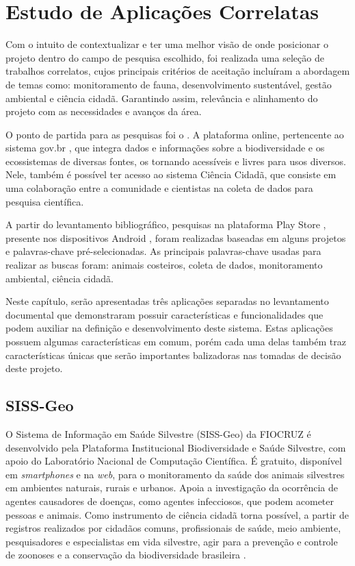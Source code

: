 \chapter{Estudo de Aplicações Correlatas}\label{trabalhos-correlatos}

Com o intuito de contextualizar e ter uma melhor visão de onde posicionar o projeto dentro do campo de pesquisa escolhido, foi realizada uma seleção de trabalhos correlatos, cujos principais critérios de aceitação incluíram a abordagem de temas como: monitoramento de fauna, desenvolvimento sustentável, gestão ambiental e ciência cidadã. Garantindo assim, relevância e alinhamento do projeto com as necessidades e avanços da área.

O ponto de partida para as pesquisas foi o . A plataforma online, pertencente ao sistema gov.br \cite{govbr2024}, que integra dados e informações sobre a biodiversidade e os ecossistemas de diversas fontes, os tornando acessíveis e livres para usos diversos. Nele, também é possível ter acesso ao sistema Ciência Cidadã, que consiste em uma colaboração entre a comunidade e cientistas na coleta de dados para pesquisa científica. 

A partir do levantamento bibliográfico, pesquisas na plataforma Play Store \cite{playstore2024}, presente nos dispositivos Android \cite{android2024}, foram realizadas baseadas em alguns projetos e palavras-chave pré-selecionadas. As principais palavras-chave usadas para realizar as buscas foram: animais costeiros, coleta de dados, monitoramento ambiental, ciência cidadã.

Neste capítulo, serão apresentadas três aplicações separadas no levantamento documental que  demonstraram possuir características e funcionalidades que podem auxiliar na definição e desenvolvimento deste sistema. Estas aplicações possuem algumas características em comum, porém cada uma delas também traz características únicas que serão importantes balizadoras nas tomadas de decisão deste projeto.

\section{SISS-Geo}\label{siss-geo}

O Sistema de Informação em Saúde Silvestre (SISS-Geo) da FIOCRUZ é desenvolvido pela Plataforma Institucional Biodiversidade e Saúde Silvestre, com apoio do Laboratório Nacional de Computação Científica. É gratuito, disponível em \textit{smartphones} e na \textit{web}, para o monitoramento da saúde dos animais silvestres em ambientes naturais, rurais e urbanos. Apoia a investigação da ocorrência de agentes causadores de doenças, como agentes infecciosos, que podem acometer pessoas e animais. Como instrumento de ciência cidadã torna possível, a partir de registros realizados por cidadãos comuns, profissionais de saúde, meio ambiente, pesquisadores e especialistas em vida silvestre, agir para a prevenção e controle de zoonoses e a conservação da biodiversidade brasileira \cite{chame2015sissgeo}.

